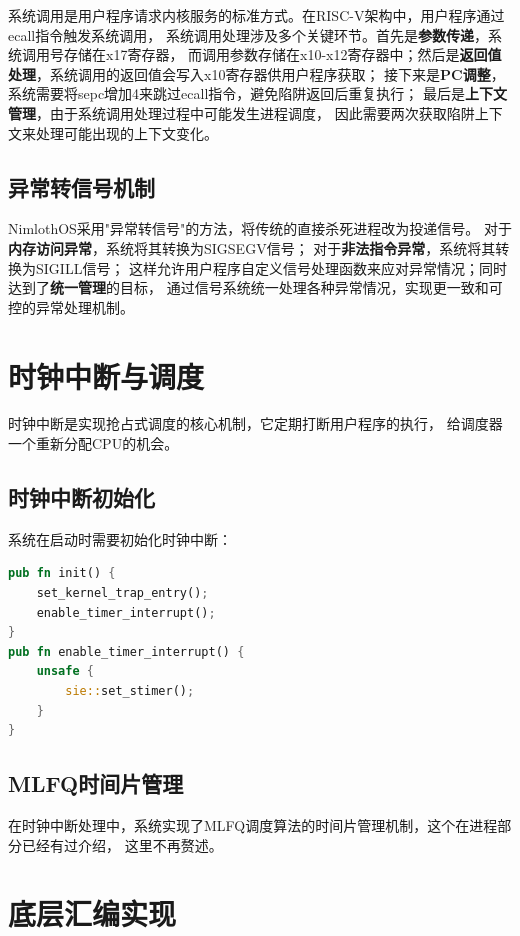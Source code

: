 系统调用是用户程序请求内核服务的标准方式。在RISC-V架构中，用户程序通过ecall指令触发系统调用，
系统调用处理涉及多个关键环节。首先是\textbf{参数传递}，系统调用号存储在x17寄存器，
而调用参数存储在x10-x12寄存器中；然后是\textbf{返回值处理}，系统调用的返回值会写入x10寄存器供用户程序获取；
接下来是\textbf{PC调整}，系统需要将sepc增加4来跳过ecall指令，避免陷阱返回后重复执行；
最后是\textbf{上下文管理}，由于系统调用处理过程中可能发生进程调度，
因此需要两次获取陷阱上下文来处理可能出现的上下文变化。

\subsection{异常转信号机制}

NimlothOS采用"异常转信号"的方法，将传统的直接杀死进程改为投递信号。
对于\textbf{内存访问异常}，系统将其转换为SIGSEGV信号；
对于\textbf{非法指令异常}，系统将其转换为SIGILL信号；
这样允许用户程序自定义信号处理函数来应对异常情况；同时达到了\textbf{统一管理}的目标，
通过信号系统统一处理各种异常情况，实现更一致和可控的异常处理机制。

\section{时钟中断与调度}

时钟中断是实现抢占式调度的核心机制，它定期打断用户程序的执行，
给调度器一个重新分配CPU的机会。

\subsection{时钟中断初始化}

系统在启动时需要初始化时钟中断：

\begin{lstlisting}[language=Rust,caption={时钟中断初始化}, label={lst:timer-init}]
pub fn init() {
    set_kernel_trap_entry();
    enable_timer_interrupt();
}
pub fn enable_timer_interrupt() {
    unsafe {
        sie::set_stimer();
    }
}
\end{lstlisting}

\subsection{MLFQ时间片管理}

在时钟中断处理中，系统实现了MLFQ调度算法的时间片管理机制，这个在进程部分已经有过介绍，
这里不再赘述。

\section{底层汇编实现}

